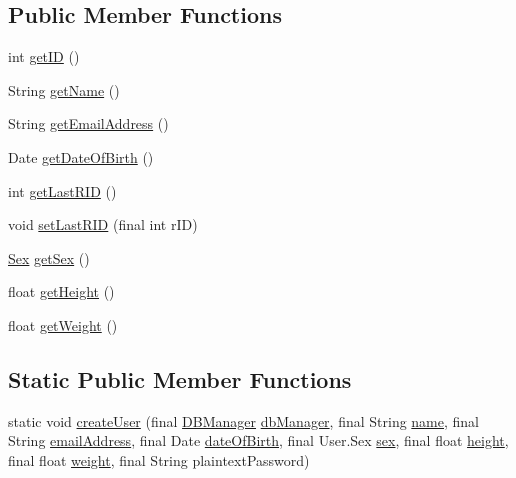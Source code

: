 \subsection*{Public Member Functions}
\begin{DoxyCompactItemize}
\item 
int \mbox{\hyperlink{classcom_1_1activitytracker_1_1_user_a967ae64a7818e9e532ad6d361650d8e6}{get\+ID}} ()
\item 
String \mbox{\hyperlink{classcom_1_1activitytracker_1_1_user_a6b39e49a1e49279035fd61a667d14f64}{get\+Name}} ()
\item 
String \mbox{\hyperlink{classcom_1_1activitytracker_1_1_user_a79d69ca90216e0552ac4cae9778ea40d}{get\+Email\+Address}} ()
\item 
Date \mbox{\hyperlink{classcom_1_1activitytracker_1_1_user_a40da04454cea10bb5c6e6125a7a9cf64}{get\+Date\+Of\+Birth}} ()
\item 
int \mbox{\hyperlink{classcom_1_1activitytracker_1_1_user_a7040d0d696d79f9592eec6ac507de3c7}{get\+Last\+R\+ID}} ()
\item 
void \mbox{\hyperlink{classcom_1_1activitytracker_1_1_user_a9e91c79596a9a4dfda7b3453b61ff8d2}{set\+Last\+R\+ID}} (final int r\+ID)
\item 
\mbox{\hyperlink{enumcom_1_1activitytracker_1_1_user_1_1_sex}{Sex}} \mbox{\hyperlink{classcom_1_1activitytracker_1_1_user_ac184fdb794730df3fedf3b147283a5fd}{get\+Sex}} ()
\item 
float \mbox{\hyperlink{classcom_1_1activitytracker_1_1_user_a2a80ab659d02a07176b1793354131c00}{get\+Height}} ()
\item 
float \mbox{\hyperlink{classcom_1_1activitytracker_1_1_user_ad15d7b4f96adb6d1a14054bf3eb7e4e0}{get\+Weight}} ()
\end{DoxyCompactItemize}
\subsection*{Static Public Member Functions}
\begin{DoxyCompactItemize}
\item 
static void \mbox{\hyperlink{classcom_1_1activitytracker_1_1_user_a615393e15084d20a59ad712419cfec92}{create\+User}} (final \mbox{\hyperlink{classcom_1_1activitytracker_1_1_d_b_manager}{D\+B\+Manager}} \mbox{\hyperlink{classcom_1_1activitytracker_1_1_user_a8c8b36433447a235f2b4940b92e839c1}{db\+Manager}}, final String \mbox{\hyperlink{classcom_1_1activitytracker_1_1_user_a49bfb4c8ebf8b7a377df01b5f0b2d7bc}{name}}, final String \mbox{\hyperlink{classcom_1_1activitytracker_1_1_user_ac2fdb9a858d0295e52c5f8bc179e3137}{email\+Address}}, final Date \mbox{\hyperlink{classcom_1_1activitytracker_1_1_user_a40b0d4ce16246066c0e948edef864d94}{date\+Of\+Birth}}, final User.\+Sex \mbox{\hyperlink{classcom_1_1activitytracker_1_1_user_adcbddd2e965af4e227f7cf0582a3e13d}{sex}}, final float \mbox{\hyperlink{classcom_1_1activitytracker_1_1_user_a83cdfe6f520a4e18e8710e8e11f8c3d6}{height}}, final float \mbox{\hyperlink{classcom_1_1activitytracker_1_1_user_a8a30c6c08983e513b462bcc035434c9e}{weight}}, final String plaintext\+Password)
\end{DoxyCompactItemize}
